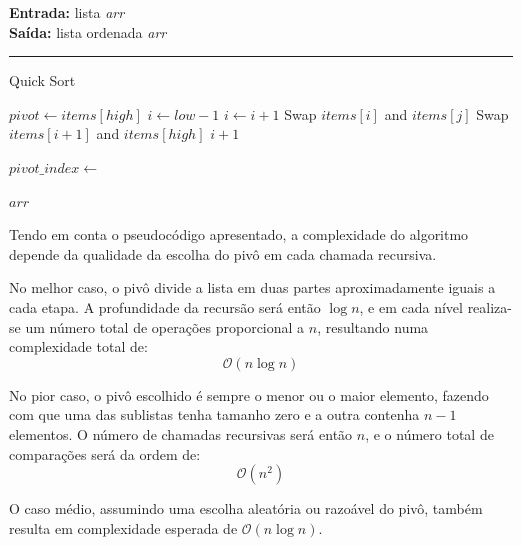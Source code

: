 \documentclass[conference]{IEEEtran}
\begin{document}
\begin{algorithm}[H]
    \raggedright
    \vspace{.1em}
    \textbf{Entrada:} lista \textit{arr} \\
    \textbf{Saída:} lista ordenada \textit{arr} \\
    \vspace{.5em}
    \hrule 
    \caption{Quick Sort}
    \begin{algorithmic}[1]
            \State $pivot \gets items[high]$
            \State $i \gets low - 1$
                    \State $i \gets i + 1$
                    \State Swap $items[i]$ and $items[j]$
                \EndIf
            \EndFor
            \State Swap $items[i + 1]$ and $items[high]$
            \State \Return $i + 1$
        \EndFunction
    
                \State $pivot\_index \gets$ 
                \State {}
                \State {}
            \EndIf
        \EndFunction
    
        \State {}
        \State \Return $arr$
    \end{algorithmic}
\end{algorithm}

Tendo em conta o pseudocódigo apresentado, a complexidade do algoritmo depende da qualidade da escolha do pivô em cada chamada recursiva.

No melhor caso, o pivô divide a lista em duas partes aproximadamente iguais a cada etapa. A profundidade da recursão será então \(\log n\), e em cada nível realiza-se um número total de operações proporcional a \(n\), resultando numa complexidade total de:
\[
\mathcal{O}(n \log n)
\]

No pior caso, o pivô escolhido é sempre o menor ou o maior elemento, fazendo com que uma das sublistas tenha tamanho zero e a outra contenha \(n - 1\) elementos. O número de chamadas recursivas será então \(n\), e o número total de comparações será da ordem de:
\[
\mathcal{O}(n^2)
\]

O caso médio, assumindo uma escolha aleatória ou razoável do pivô, também resulta em complexidade esperada de \(\mathcal{O}(n \log n)\).
\end{document}
